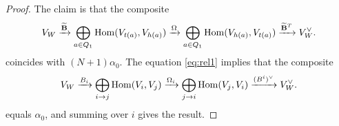 \documentclass{amsart}
\theoremstyle{definition}
\newcommand\VW{V_W}
\begin{document}
\begin{proof}
The claim is that the composite
\begin{equation}
    \VW \xrightarrow{\widetilde{\bfB}} \bigoplus_{a \in Q_1} \Hom(V_{t(a)}, V_{h(a)}) \xrightarrow{\Omega} \bigoplus_{a \in Q_1} \Hom(V_{h(a)}, V_{t(a)}) \xrightarrow{\widetilde{\bfB}^T} \VW^\vee.
\end{equation}
coincides with $(N+1)\alpha_0$. The equation \eqref{eq:rel1} implies that the composite
\begin{equation}
    \VW \xrightarrow{B_i} \bigoplus_{i \rightarrow j} \Hom(V_i, V_{j}) \xrightarrow{\Omega_i} \bigoplus_{j \rightarrow i} \Hom(V_{j}, V_{i}) \xrightarrow{(B^i)^\vee} \VW^\vee.
\end{equation}
equals $\alpha_0$, and summing over $i$ gives the result.
\end{proof}

\end{document}
